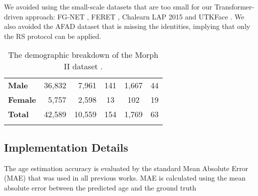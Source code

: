\documentclass[10pt,journal]{IEEEtran}\usepackage{amsfonts}
\begin{document}
We avoided using the small-scale datasets that are too small for our
Transformer-driven approach: FG-NET \cite{cootes2008fg}, FERET
\cite{PHILLIPS1998295}, Chalearn LAP 2015 \cite{agustsson2017appareal} and
UTKFace \cite{zhifei2017cvpr}. We also avoided the AFAD dataset \cite{7780901}
that is missing the identities, implying that only the RS protocol can be
applied.\begin{table}[tbh]
\caption{The demographic breakdown of the Morph II dataset \cite{1613043}.}\label{table:demographic_comparison}
\centering
\renewcommand{\arraystretch}{1.3}
\begin{tabular}
[c]{@{}lrrccc}\toprule &  &  &  &
 & \\
\midrule \textbf{Male} & 36,832 & 7,961 & 141 & 1,667 & 44\\
\textbf{Female} & 5,757 & 2,598 & 13 & 102 & 19\\
\textbf{Total} & 42,589 & 10,559 & 154 & 1,769 & 63\\
\bottomrule &  &  &  &  &
\end{tabular}
\end{table}

\subsection{Implementation Details}

\label{subsec:Implementation Details}

The age estimation accuracy is evaluated by the standard Mean Absolute Error
(MAE) that was used in all previous works. MAE is calculated using the mean
absolute error between the predicted age  and the
ground truth 
\end{document}
